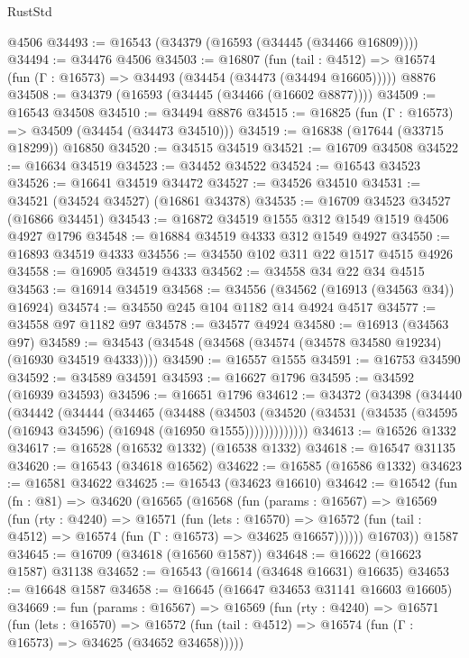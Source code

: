 \begin{lexlean}{RustStd}
\begin{coremodule}
    @4506
@34493 := @16543 (@34379 (@16593 (@34445 (@34466 @16809))))
@34494 := @34476 @4506
@34503 := @16807
    (fun (tail : @4512) => @16574 (fun (Γ : @16573) => @34493 (@34454 (@34473 (@34494 @16605)))))
    @8876
@34508 := @34379 (@16593 (@34445 (@34466 (@16602 @8877))))
@34509 := @16543 @34508
@34510 := @34494 @8876
@34515 := @16825 (fun (Γ : @16573) => @34509 (@34454 (@34473 @34510)))
@34519 := @16838 (@17644 (@33715 @18299)) @16850
@34520 := @34515 @34519
@34521 := @16709 @34508
@34522 := @16634 @34519
@34523 := @34452 @34522
@34524 := @16543 @34523
@34526 := @16641 @34519 @34472
@34527 := @34526 @34510
@34531 := @34521 (@34524 @34527) (@16861 @34378)
@34535 := @16709 @34523 @34527 (@16866 @34451)
@34543 := @16872 @34519 @1555 @312 @1549 @1519 @4506 @4927 @1796
@34548 := @16884 @34519 @4333 @312 @1549 @4927
@34550 := @16893 @34519 @4333
@34556 := @34550 @102 @311 @22 @1517 @4515 @4926
@34558 := @16905 @34519 @4333
@34562 := @34558 @34 @22 @34 @4515
@34563 := @16914 @34519
@34568 := @34556 (@34562 (@16913 (@34563 @34)) @16924)
@34574 := @34550 @245 @104 @1182 @14 @4924 @4517
@34577 := @34558 @97 @1182 @97
@34578 := @34577 @4924
@34580 := @16913 (@34563 @97)
@34589 := @34543 (@34548 (@34568 (@34574 (@34578 @34580 @19234) (@16930 @34519 @4333))))
@34590 := @16557 @1555
@34591 := @16753 @34590
@34592 := @34589 @34591
@34593 := @16627 @1796
@34595 := @34592 (@16939 @34593)
@34596 := @16651 @1796
@34612 := @34372
    (@34398
      (@34440
        (@34442
          (@34444
            (@34465
              (@34488
                (@34503
                  (@34520 (@34531 (@34535 (@34595 (@16943 @34596) (@16948 (@16950 @1555)))))))))))))
@34613 := @16526 @1332
@34617 := @16528 (@16532 @1332) (@16538 @1332)
@34618 := @16547 @31135
@34620 := @16543 (@34618 @16562)
@34622 := @16585 (@16586 @1332)
@34623 := @16581 @34622
@34625 := @16543 (@34623 @16610)
@34642 := @16542
    (fun (fn : @81) =>
    @34620
      (@16565
        (@16568
          (fun (params : @16567) =>
          @16569
            (fun (rty : @4240) =>
            @16571
              (fun (lets : @16570) =>
              @16572 (fun (tail : @4512) => @16574 (fun (Γ : @16573) => @34625 @16657))))))
        @16703))
    @1587
@34645 := @16709 (@34618 (@16560 @1587))
@34648 := @16622 (@16623 @1587) @31138
@34652 := @16543 (@16614 (@34648 @16631) @16635)
@34653 := @16648 @1587
@34658 := @16645 (@16647 @34653 @31141 @16603 @16605)
@34669 := fun (params : @16567) =>
  @16569
    (fun (rty : @4240) =>
    @16571
      (fun (lets : @16570) =>
      @16572 (fun (tail : @4512) => @16574 (fun (Γ : @16573) => @34625 (@34652 @34658)))))

\end{coremodule}
\end{lexlean}
